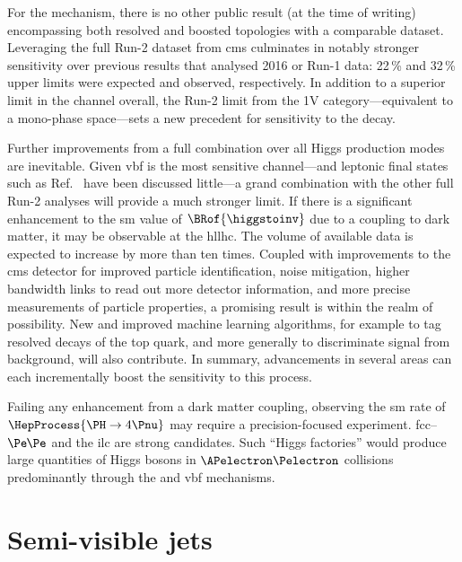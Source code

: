 For the \VH mechanism, there is no other public result (at the time of writing) encompassing both resolved and boosted topologies with a comparable dataset. Leveraging the full Run-2 dataset from \acrshort{cms} culminates in notably stronger sensitivity over previous results that analysed 2016 or Run-1 data: 22\,\% and 32\,\% upper limits were expected and observed, respectively. In addition to a superior limit in the \VH channel overall, the Run-2 limit from the 1V category---equivalent to a mono-\PVec phase space---sets a new precedent for sensitivity to the \higgstoinv decay.

Further improvements from a full combination over all Higgs production modes are inevitable. Given \acrshort{vbf} is the most sensitive channel---and leptonic final states such as Ref.~ have been discussed little---a grand combination with the other full Run-2 analyses will provide a much stronger limit. If there is a significant enhancement to the \acrshort{sm} value of $\BRof{\higgstoinv}$ due to a coupling to dark matter, it may be observable at the \acrshort{hllhc}. The volume of available data is expected to increase by more than ten times. Coupled with improvements to the \acrshort{cms} detector for improved particle identification, noise mitigation, higher bandwidth links to read out more detector information, and more precise measurements of particle properties, a promising result is within the realm of possibility. New and improved machine learning algorithms, for example to tag resolved decays of the top quark, and more generally to discriminate signal from background, will also contribute. In summary, advancements in several areas can each incrementally boost the sensitivity to this process.

Failing any enhancement from a dark matter coupling, observing the \acrshort{sm} rate of $\HepProcess{\PH \to \text{4}\Pnu}$ may require a precision-focused experiment. \acrshort{fcc}--$\Pe\mkern-1mu\Pe$ and the \acrshort{ilc} are strong candidates. Such ``Higgs factories'' would produce large quantities of Higgs bosons in $\APelectron \Pelectron$ collisions predominantly through the \VH and \acrshort{vbf} mechanisms.




\section{Semi-visible jets}
\label{sec:conclusions_svj}

